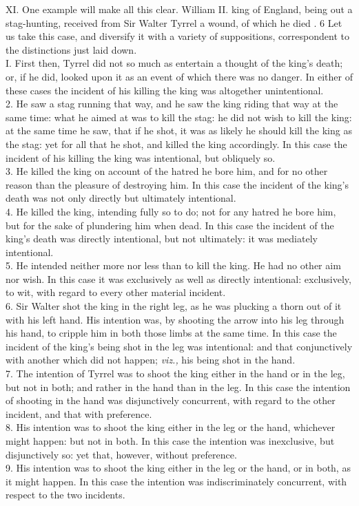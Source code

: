 \documentclass[12pt]{report}
\begin{document}
XI. One example will make all this clear. William II. king of England,
being out a stag-hunting, received from Sir Walter Tyrrel a wound, of
which he died . 6 Let us take this case, and diversify it with a variety
of suppositions, correspondent to the distinctions just laid down.\\
I. First then, Tyrrel did not so much as entertain a thought of the
king's death; or, if he did, looked upon it as an event of which there
was no danger. In either of these cases the incident of his killing the
king was altogether unintentional.\\
2. He saw a stag running that way, and he saw the king riding that way
at the same time: what he aimed at was to kill the stag: he did not wish
to kill the king: at the same time he saw, that if he shot, it was as
likely he should kill the king as the stag: yet for all that he shot,
and killed the king accordingly. In this case the incident of his
killing the king was intentional, but obliquely so.\\
3. He killed the king on account of the hatred he bore him, and for no
other reason than the pleasure of destroying him. In this case the
incident of the king's death was not only directly but ultimately
intentional.\\
4. He killed the king, intending fully so to do; not for any hatred he
bore him, but for the sake of plundering him when dead. In this case the
incident of the king's death was directly intentional, but not
ultimately: it was mediately intentional.\\
5. He intended neither more nor less than to kill the king. He had no
other aim nor wish. In this case it was exclusively as well as directly
intentional: exclusively, to wit, with regard to every other material
incident.\\
6. Sir Walter shot the king in the right leg, as he was plucking a thorn
out of it with his left hand. His intention was, by shooting the arrow
into his leg through his hand, to cripple him in both those limbs at the
same time. In this case the incident of the king's being shot in the leg
was intentional: and that conjunctively with another which did not
happen; \emph{viz.,} his being shot in the hand.\\
7. The intention of Tyrrel was to shoot the king either in the hand or
in the leg, but not in both; and rather in the hand than in the leg. In
this case the intention of shooting in the hand was disjunctively
concurrent, with regard to the other incident, and that with
preference.\\
8. His intention was to shoot the king either in the leg or the hand,
whichever might happen: but not in both. In this case the intention was
inexclusive, but disjunctively so: yet that, however, without
preference.\\
9. His intention was to shoot the king either in the leg or the hand, or
in both, as it might happen. In this case the intention was
indiscriminately concurrent, with respect to the two incidents.
\end{document}
